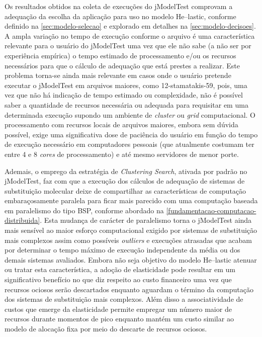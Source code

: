 \documentclass[english,brazilian]{UNISINOSmonografia} %
\begin{document}
Os resultados obtidos na coleta de execuções do jModelTest comprovam a adequação da escolha da aplicação para uso no modelo \textsf{He}--lastic, conforme definido na \autoref{sec:modelo-selecao} e explorado em detalhes na \autoref{sec:modelo-decisoes}.
%
A ampla variação no tempo de execução conforme o arquivo é uma característica relevante para o usuário do jModelTest uma vez que ele não sabe (a não ser por experiência empírica) o tempo estimado de processamento e/ou os recursos necessários para que o cálculo de adequação que está prestes a realizar.
%
Este problema torna-se ainda mais relevante em casos onde o usuário pretende executar o jModelTest em arquivos maiores, como 12-stamatakis-59, pois, uma vez que não há indicação de tempo estimado ou complexidade, não é possível saber a quantidade de recursos necessária ou adequada para requisitar em uma determinada execução supondo um ambiente de \textit{cluster} ou \textit{grid} computacional.
%
O processamento com recursos locais de arquivos maiores, embora sem dúvida possível, exige uma significativa dose de paciência do usuário em função do tempo de execução necessário em computadores pessoais (que atualmente costumam ter entre 4 e 8 \textit{cores} de processamento) e até mesmo servidores de menor porte.



Ademais, o emprego da estratégia de \textit{Clustering Search}, ativada por padrão no jModelTest, faz com que a execução dos cálculos de adequação de sistemas de substituição molecular deixe de compartilhar as características de computação embaraçosamente paralela para ficar mais parecido com uma computação baseada em paralelismo do tipo BSP, conforme abordado na \autoref{fundamentacao-computacao-distribuida}.
%
Esta mudança de carácter de paralelismo torna o jModelTest ainda mais sensível ao maior esforço computacional exigido por sistemas de substituição mais complexos assim como possíveis \textit{outliers} e execuções atrasadas que acabam por determinar o tempo máximo de execução independente da média ou dos demais sistemas avaliados.
%
Embora não seja objetivo do modelo \textsf{He}--lastic atenuar ou tratar esta característica, a adoção de elasticidade pode resultar em um significativo benefício no que diz respeito ao custo financeiro uma vez que recursos ociosos serão descartados enquanto aguardam o término da computação dos sistemas de substituição mais complexos.
%
Além disso a associatividade de custos que emerge da elasticidade permite empregar um número maior de recursos durante momentos de pico enquanto mantém um custo similar ao modelo de alocação fixa por meio do descarte de recursos ociosos.
\end{document}
